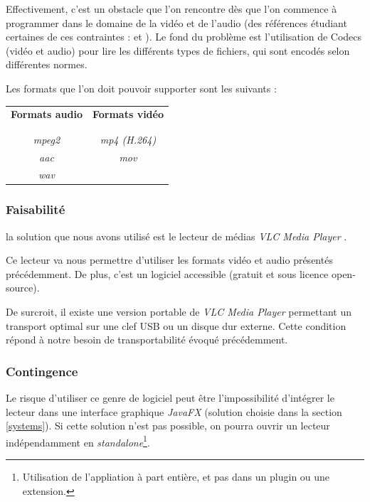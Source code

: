 Effectivement, c’est un obstacle que l’on rencontre dès que l’on commence à programmer dans le domaine de la vidéo et de l’audio (des références étudiant certaines de ces contraintes : \cite{ghanbari1999video} et \cite{he2013introduction}).
Le fond du problème est l’utilisation de Codecs (vidéo et audio) pour lire les différents types de fichiers, qui sont encodés selon différentes normes.

Les formats que l’on doit pouvoir supporter sont les suivants :\\

\begin{center}
\begin{tabular}{c|c}
\textbf{Formats audio} & \textbf{Formats vidéo} \\
\\
\hline
\\
\textit{mpeg2} & \textit{mp4 (H.264)}\\
\textit{aac} & \textit{mov}\\
\textit{wav} & ~
\end{tabular}
\end{center}
\vspace{0.6cm}

\subsubsection{Faisabilité}

la solution que nous avons utilisé est le lecteur de médias \textit{VLC Media Player} \cite{solutions2006vlc}.

Ce lecteur va nous permettre d'utiliser les formats vidéo et audio présentés précédemment. De plus, c'est un logiciel accessible (gratuit et sous licence open-source).

De surcroit, il existe une version portable de \textit{VLC Media Player} permettant un transport optimal sur une clef USB ou un disque dur externe. Cette condition répond à notre besoin de transportabilité évoqué précédemment.

\subsubsection{Contingence}

Le risque d’utiliser ce genre de logiciel peut être l'impossibilité d'intégrer le lecteur dans une interface graphique \textit{JavaFX} (solution choisie dans la section \ref{systems}). Si cette solution n’est pas possible, on pourra ouvrir un lecteur indépendamment en \textit{standalone}\footnote{Utilisation de l'appliation à part entière, et pas dans un plugin ou une extension.}.

